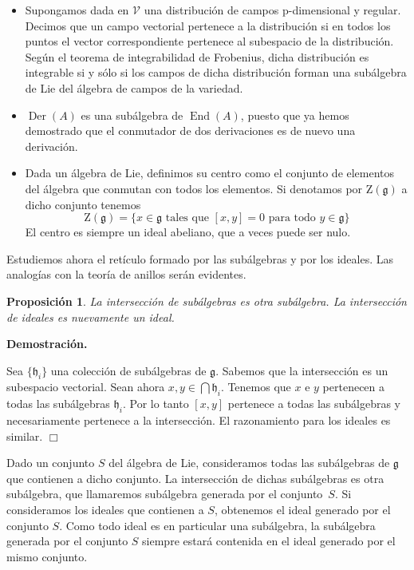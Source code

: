 \documentclass[a4paper,draft,12pt]{scrartcl}
\newtheorem{propo}[teo]{Proposición}%
\newcommand{\dem}{\noindent \textbf{Demostración. }\vspace{0.3 cm}}%
\newcommand{\g}{\mathfrak{g}}%
\newcommand{\fin}{ $\Box $ \vspace{0.4 cm}}
\newcommand{\df}[1]{\textsf{\color{blue}#1}}
\DeclareMathOperator{\End}{End}%
\DeclareMathOperator{\Der}{Der}%
\begin{document}
\begin{itemize}
\item Supongamos dada en $\mathcal{V}$ una distribución de campos  p-dimensional y regular. Decimos que un campo vectorial pertenece a la distribución si en todos los puntos el vector correspondiente pertenece al subespacio de la distribución. Según el teorema de integrabilidad de Frobenius,  dicha distribución es integrable si y sólo si los campos de dicha distribución forman una subálgebra de Lie del álgebra de campos de la variedad.

\item $\Der  (A)$ es una subálgebra de $\End (A)$, puesto que ya hemos demostrado que el conmutador de dos derivaciones es de nuevo una derivación.


\item Dada un álgebra de Lie, definimos su \df{centro} como el conjunto de elementos del álgebra que conmutan con todos los elementos.  Si denotamos por $\mathrm{Z}(\g)$ a dicho conjunto tenemos
\[
\mathrm{Z}(\g)=\{ x \in \g \text{ tales que } [x,y] = 0 \text{ para todo } y \in \g\}
\]
El centro es siempre un ideal abeliano, que a veces puede ser nulo. 

\end{itemize}


 
 Estudiemos ahora el retículo formado por las subálgebras y por los ideales. Las analogías con la teoría de anillos serán evidentes.
 
 \begin{propo}
 
 La intersección de subálgebras es otra subálgebra.  La intersección de ideales es nuevamente un ideal.
 
 \end{propo}

\dem

Sea $\{\mathfrak{h}_i\}$ una colección de subálgebras de $\g$.  Sabemos que la intersección es un subespacio vectorial.  Sean ahora $ x,y \in \bigcap\mathfrak{h}_i$. Tenemos que $x$ e $y$ pertenecen a todas las subálgebras $\mathfrak{h}_i$. Por lo tanto $[x,y]$ pertenece a todas las subálgebras y necesariamente pertenece a la intersección.  El razonamiento para los ideales es similar.  \fin

Dado un conjunto $S$ del álgebra de Lie, consideramos todas las subálgebras de $\g$ que contienen a dicho conjunto.  La intersección de dichas subálgebras es otra subálgebra, que llamaremos  \df{subálgebra generada}  por el conjunto~$S$.  Si consideramos los ideales que contienen a $S$, obtenemos el  \df{ideal generado} por el conjunto $S$. Como todo ideal es en particular una subálgebra, la subálgebra generada por el conjunto $S$ siempre estará contenida en el ideal generado  por el mismo conjunto.
\end{document}
